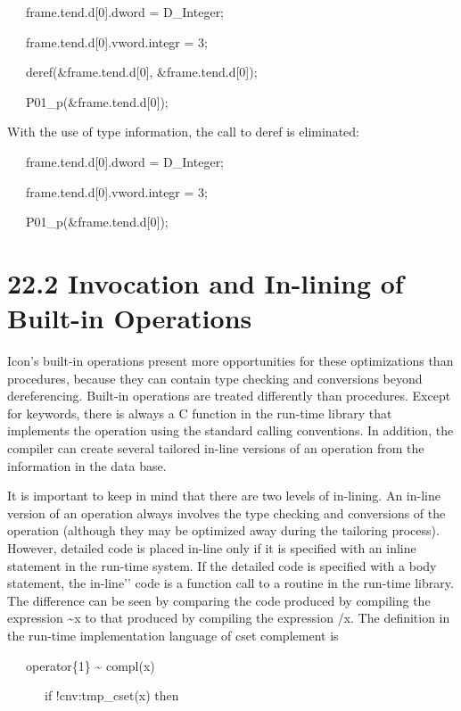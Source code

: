 {\ttfamily\mdseries
\ \ \ frame.tend.d[0].dword = D\_Integer;}

{\ttfamily\mdseries
\ \ \ frame.tend.d[0].vword.integr = 3;}

{\ttfamily\mdseries
\ \ \ deref(\&frame.tend.d[0], \&frame.tend.d[0]);}

{\ttfamily\mdseries
\ \ \ P01\_p(\&frame.tend.d[0]);}


With the use of type information, the call to deref is eliminated: 

{\ttfamily\mdseries
\ \ \ frame.tend.d[0].dword = D\_Integer;}

{\ttfamily\mdseries
\ \ \ frame.tend.d[0].vword.integr = 3;}

{\ttfamily\mdseries
\ \ \ P01\_p(\&frame.tend.d[0]);}


\section[22.2 Invocation and In-lining of Built-in Operations]{22.2 Invocation and In-lining of Built-in Operations}

Icon's built-in operations present more opportunities for these
optimizations than procedures, because they can contain type checking
and conversions beyond dereferencing. Built-in operations are treated
differently than procedures. Except for keywords, there is always a C
function in the run-time library that implements the operation using
the standard calling conventions. In addition, the compiler can create
several tailored in-line versions of an operation from the information
in the data base.

It is important to keep in mind that there are two levels of
in-lining. An in-line version of an operation always involves the type
checking and conversions of the operation (although they may be
optimized away during the tailoring process). However, detailed code
is placed in-line only if it is specified with an inline statement in
the run-time system. If the detailed code is specified with a body
statement, the {\textasciigrave}{\textasciigrave}in-line'{}' code is a
function call to a routine in the run-time library. The difference can
be seen by comparing the code produced by compiling the expression
\~{}x to that produced by compiling the expression /x. The definition
in the run-time implementation language of cset complement is

{\ttfamily\mdseries
\ \ \ operator\{1\} \~{} compl(x)}

{\ttfamily\mdseries
\ \ \ \ \ \ if !cnv:tmp\_cset(x) then}

